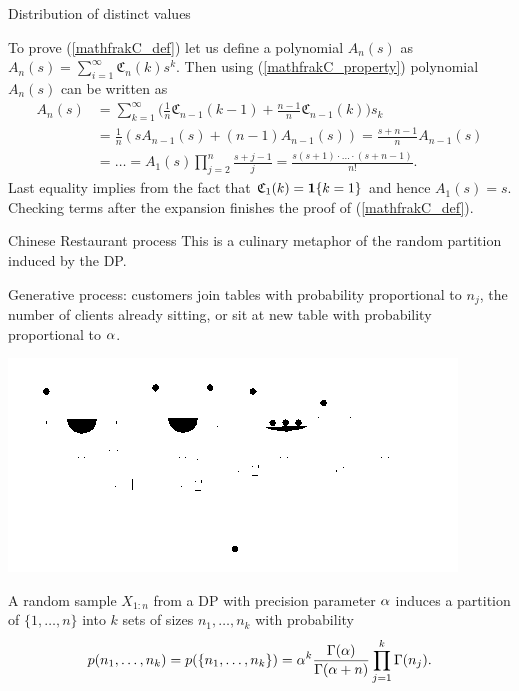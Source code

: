 \begin{frame}{Distribution of distinct values}

To prove (\ref{mathfrakC_def}) let us define a polynomial $A_n(s)$ as $A_n(s) = \sum_{i=1}^\infty \mathfrak{C}_n(k)s^k$. Then using (\ref{mathfrakC_property}) polynomial $A_n(s)$ can be written as
\begin{equation*}
\begin{split}
    A_n(s)&=\sum_{k=1}^\infty \bigg(  \frac 1n \mathfrak{C}_{n-1}(k-1)+\frac{n-1}{n}\mathfrak{C}_{n-1}(k)   \bigg) s_k\\
    &=\frac{1}{n}( s A_{n-1}(s) +(n-1) A_{n-1}(s) )=\frac{s+n-1}{n}A_{n-1}(s)\\
    &=\ldots=A_1(s)\prod_{j=2}^n\frac{s+j-1}{j}=\frac{s(s+1)\cdot\ldots\cdot(s+n-1)}{n!}.
\end{split}
\end{equation*}
Last equality implies from the fact that $\mathfrak{C}_1(k)=\mathbf 1\{k=1\}$ and hence $A_1(s)=s$. Checking terms after the expansion finishes the proof of (\ref{mathfrakC_def}).


\end{frame}

\begin{frame}{Chinese Restaurant process}
This is a culinary metaphor of the \alert{random partition} induced by the DP. 

\alert{Generative process}: customers join tables with probability proportional to \alert{$n_j$}, the number of clients already sitting, or sit at \alert{new table} with probability  proportional to \alert{$\alpha$}.
\begin{center}
	\includegraphics[width = .5\textwidth]{figures_julyan/intro_DP/CRP}
\end{center}

\begin{proposition}
A random sample $X_{1:n}$ from a DP with precision parameter $\alpha$ induces a partition of $\{1,\ldots,n\}$ into $k$ sets of sizes $n_1,\ldots,n_k$ with probability 
\begin{equation*}
    p(n_1,\ldots,n_k)=p(\{n_1,\ldots,n_k\})=\alpha^k\frac{\Gamma(\alpha)}{\Gamma(\alpha+n)}\prod_{j=1}^k\Gamma (n_j).
\end{equation*}
\end{proposition}

\end{frame}

